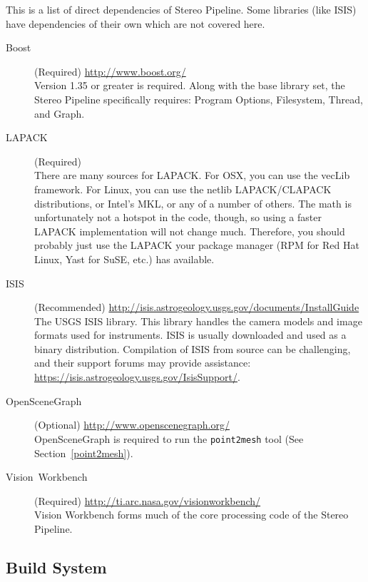 This is a list of direct dependencies of Stereo Pipeline. Some libraries
(like \ac{ISIS}) have dependencies of their own which are not covered here.

\begin{description}
\item [{Boost}] (Required) \url{http://www.boost.org/}\\
Version 1.35 or greater is required. Along with the base library
set, the Stereo Pipeline specifically requires: Program Options, Filesystem,
Thread, and Graph.

\item [{LAPACK}] (Required)\\
There are many sources for LAPACK\@. For OSX, you can use the
vecLib framework. For Linux, you can use the netlib LAPACK/CLAPACK
distributions, or Intel's MKL, or any of a number of others. The math
is unfortunately not a hotspot in the code, though, so using a faster
LAPACK implementation will not change much. Therefore, you should
probably just use the LAPACK your package manager (RPM for Red Hat
Linux, Yast for SuSE, etc.) has available.

\item [{ISIS}] (Recommended) \url{http://isis.astrogeology.usgs.gov/documents/InstallGuide}\\
The \ac{USGS} \acf{ISIS}
library. This library handles the camera models and image formats used
for instruments.  \ac{ISIS} is usually downloaded and used as a binary
distribution.  Compilation of \ac{ISIS} from source can be challenging,
and their support forums may provide assistance:
\url{https://isis.astrogeology.usgs.gov/IsisSupport/}.

\item [{OpenSceneGraph}] (Optional) \url{http://www.openscenegraph.org/}\\
OpenSceneGraph is required to run the \texttt{point2mesh} tool
(See Section~\ref{point2mesh}).

\item [{Vision~Workbench}] (Required) \url{http://ti.arc.nasa.gov/visionworkbench/}\\
Vision Workbench forms much of the core processing code of the
Stereo Pipeline.

\end{description}

\subsection{Build System}

